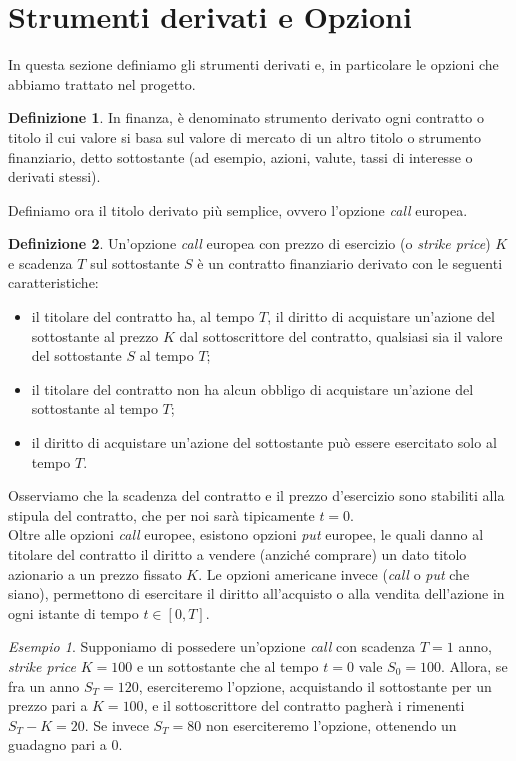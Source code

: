 \documentclass[a4paper,10pt]{report}
\theoremstyle{plain}
\theoremstyle{definition}
\newtheorem{definition}{Definizione}[chapter]
\theoremstyle{remark}
\newtheorem{esempio}{Esempio}%
\begin{document}
\section{Strumenti derivati e Opzioni}
In questa sezione definiamo gli strumenti derivati e, in particolare le opzioni che abbiamo trattato nel progetto.
\begin{definition}
In finanza, \`e denominato strumento derivato ogni contratto o titolo il cui valore si basa sul valore di mercato di un altro titolo o strumento finanziario, detto sottostante (ad esempio, azioni, valute, tassi di interesse o derivati stessi).
\end{definition}
Definiamo ora il titolo derivato pi\`u semplice, ovvero l'opzione \emph{call} europea.
\begin{definition}
Un'opzione \emph{call} europea con prezzo di esercizio (o \emph{strike price}) $K$ e scadenza $T$ sul sottostante $S$ \`e un contratto finanziario derivato con le seguenti caratteristiche:
\begin{itemize}
\item il titolare del contratto ha, al tempo $T$, il diritto di acquistare un'azione del sottostante al prezzo $K$ dal sottoscrittore del contratto, qualsiasi sia il valore del sottostante $S$ al tempo $T$;
\item il titolare del contratto non ha alcun obbligo di acquistare un'azione del sottostante al tempo $T$;
\item il diritto di acquistare un'azione del sottostante pu\`o essere esercitato solo al tempo $T$.
\end{itemize}
\end{definition}
Osserviamo che la scadenza del contratto e il prezzo d'esercizio sono stabiliti alla stipula del contratto, che per noi sar\`a tipicamente $t=0$.\\Oltre alle opzioni \emph{call} europee, esistono opzioni \emph{put} europee, le quali danno al titolare del contratto il diritto a vendere (anzich\'e comprare) un dato titolo azionario a un prezzo fissato $K$. Le opzioni americane invece (\emph{call} o \emph{put} che siano), permettono di esercitare il diritto all'acquisto o alla vendita dell'azione in ogni istante di tempo $t\in[0,T]$.
\begin{esempio}
Supponiamo di possedere un'opzione \emph{call} con scadenza $T=1$ anno, \emph{strike price} $K=100$\officialeuro$ $ e un sottostante che al tempo $t=0$ vale $S_0=100$\officialeuro. Allora, se fra un anno $S_T=120$\officialeuro$ $, eserciteremo l'opzione, acquistando il sottostante per un prezzo pari a $K=100$\officialeuro$ $, e il sottoscrittore del contratto pagher\`a i rimenenti $S_T-K=20$\officialeuro$ $. Se invece $S_T=80$\officialeuro$ $ non eserciteremo l'opzione, ottenendo un guadagno pari a 0.
\end{esempio}
\end{document}
